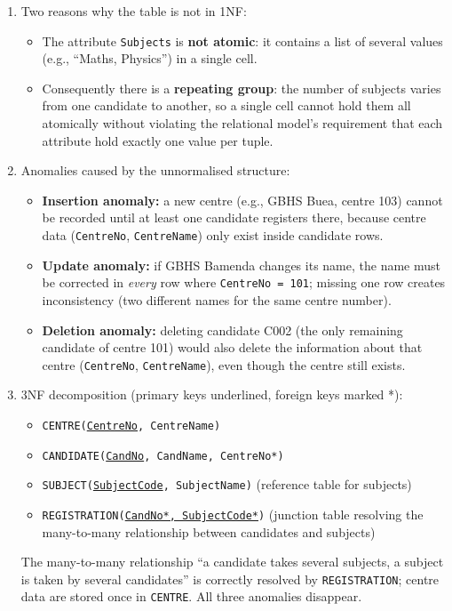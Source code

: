 \documentclass[11pt]{article}
\begin{document}
\begin{corrige}
\begin{enumerate}
\item Two reasons why the table is not in 1NF:
\begin{itemize}
\item The attribute \texttt{Subjects} is \textbf{not atomic}: it contains a list of several values (e.g., ``Maths, Physics'') in a single cell.
\item Consequently there is a \textbf{repeating group}: the number of subjects varies from one candidate to another, so a single cell cannot hold them all atomically without violating the relational model's requirement that each attribute hold exactly one value per tuple.
\end{itemize}
\item Anomalies caused by the unnormalised structure:
\begin{itemize}
\item \textbf{Insertion anomaly:} a new centre (e.g., GBHS Buea, centre 103) cannot be recorded until at least one candidate registers there, because centre data (\texttt{CentreNo}, \texttt{CentreName}) only exist inside candidate rows.
\item \textbf{Update anomaly:} if GBHS Bamenda changes its name, the name must be corrected in \emph{every} row where \texttt{CentreNo = 101}; missing one row creates inconsistency (two different names for the same centre number).
\item \textbf{Deletion anomaly:} deleting candidate C002 (the only remaining candidate of centre 101) would also delete the information about that centre (\texttt{CentreNo}, \texttt{CentreName}), even though the centre still exists.
\end{itemize}
\item 3NF decomposition (primary keys underlined, foreign keys marked *):
\begin{itemize}
\item \texttt{CENTRE(\underline{CentreNo}, CentreName)}
\item \texttt{CANDIDATE(\underline{CandNo}, CandName, CentreNo*)}
\item \texttt{SUBJECT(\underline{SubjectCode}, SubjectName)} \quad (reference table for subjects)
\item \texttt{REGISTRATION(\underline{CandNo*, SubjectCode*})} \quad (junction table resolving the many-to-many relationship between candidates and subjects)
\end{itemize}
The many-to-many relationship ``a candidate takes several subjects, a subject is taken by several candidates'' is correctly resolved by \texttt{REGISTRATION}; centre data are stored once in \texttt{CENTRE}. All three anomalies disappear.
\end{enumerate}
\end{corrige}
\end{document}
